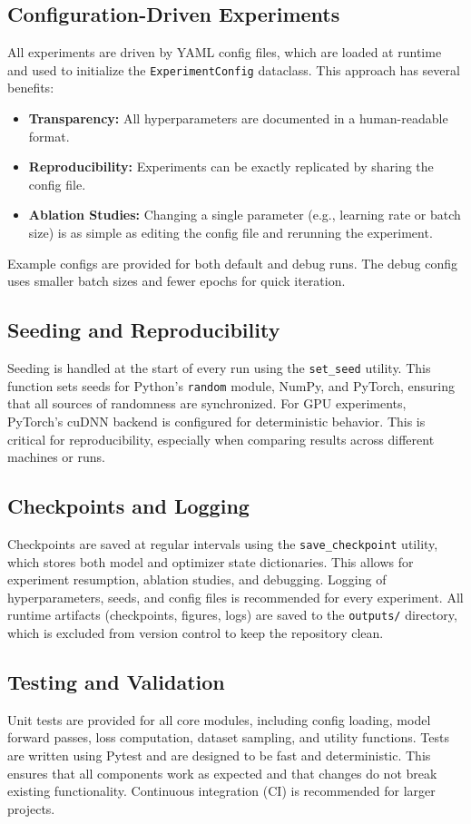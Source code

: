 \documentclass[11pt]{article}
\begin{document}
\subsection{Configuration-Driven Experiments}
All experiments are driven by YAML config files, which are loaded at runtime and used to initialize the \texttt{ExperimentConfig} dataclass. This approach has several benefits:
\begin{itemize}
  \item \textbf{Transparency:} All hyperparameters are documented in a human-readable format.
  \item \textbf{Reproducibility:} Experiments can be exactly replicated by sharing the config file.
  \item \textbf{Ablation Studies:} Changing a single parameter (e.g., learning rate or batch size) is as simple as editing the config file and rerunning the experiment.
\end{itemize}
Example configs are provided for both default and debug runs. The debug config uses smaller batch sizes and fewer epochs for quick iteration.

\subsection{Seeding and Reproducibility}
Seeding is handled at the start of every run using the \texttt{set\_seed} utility. This function sets seeds for Python's \texttt{random} module, NumPy, and PyTorch, ensuring that all sources of randomness are synchronized. For GPU experiments, PyTorch's cuDNN backend is configured for deterministic behavior. This is critical for reproducibility, especially when comparing results across different machines or runs.

\subsection{Checkpoints and Logging}
Checkpoints are saved at regular intervals using the \texttt{save\_checkpoint} utility, which stores both model and optimizer state dictionaries. This allows for experiment resumption, ablation studies, and debugging. Logging of hyperparameters, seeds, and config files is recommended for every experiment. All runtime artifacts (checkpoints, figures, logs) are saved to the \texttt{outputs/} directory, which is excluded from version control to keep the repository clean.

\subsection{Testing and Validation}
Unit tests are provided for all core modules, including config loading, model forward passes, loss computation, dataset sampling, and utility functions. Tests are written using Pytest and are designed to be fast and deterministic. This ensures that all components work as expected and that changes do not break existing functionality. Continuous integration (CI) is recommended for larger projects.
\end{document}
